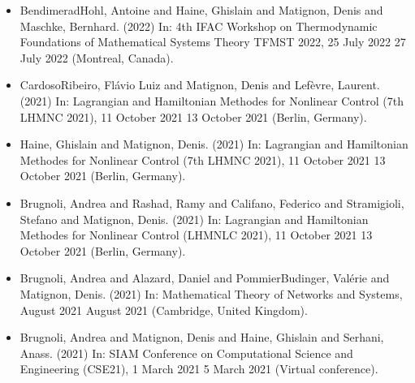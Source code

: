 \documentclass[letterpaper,10pt,english]{sphinxmanual}
\begin{document}
\begin{itemize}
\item {} 
\sphinxAtStartPar
Bendimerad\sphinxhyphen{}Hohl, Antoine and Haine, Ghislain and Matignon, Denis and Maschke, Bernhard.  (2022) In: 4th IFAC Workshop on Thermodynamic Foundations of Mathematical Systems Theory \sphinxhyphen{} TFMST 2022, 25 July 2022 \sphinxhyphen{} 27 July 2022 (Montreal, Canada).

\item {} 
\sphinxAtStartPar
Cardoso\sphinxhyphen{}Ribeiro, Flávio Luiz and Matignon, Denis and Lefèvre, Laurent.  (2021) In: Lagrangian and Hamiltonian Methodes for Nonlinear Control (7th LHMNC 2021), 11 October 2021 \sphinxhyphen{} 13 October 2021 (Berlin, Germany).

\item {} 
\sphinxAtStartPar
Haine, Ghislain and Matignon, Denis.  (2021) In: Lagrangian and Hamiltonian Methodes for Nonlinear Control (7th LHMNC 2021), 11 October 2021 \sphinxhyphen{} 13 October 2021 (Berlin, Germany).

\item {} 
\sphinxAtStartPar
Brugnoli, Andrea and Rashad, Ramy and Califano, Federico and Stramigioli, Stefano and Matignon, Denis.  (2021) In: Lagrangian and Hamiltonian Methodes for Nonlinear Control (LHMNLC 2021), 11 October 2021 \sphinxhyphen{} 13 October 2021 (Berlin, Germany).

\item {} 
\sphinxAtStartPar
Brugnoli, Andrea and Alazard, Daniel and Pommier\sphinxhyphen{}Budinger, Valérie and Matignon, Denis.  (2021) In: Mathematical Theory of Networks and Systems, August 2021 \sphinxhyphen{} August 2021 (Cambridge, United Kingdom).

\item {} 
\sphinxAtStartPar
Brugnoli, Andrea and Matignon, Denis and Haine, Ghislain and Serhani, Anass.  (2021) In: SIAM Conference on Computational Science and Engineering (CSE21), 1 March 2021 \sphinxhyphen{} 5 March 2021 (Virtual conference).


\end{itemize}
\end{document}
